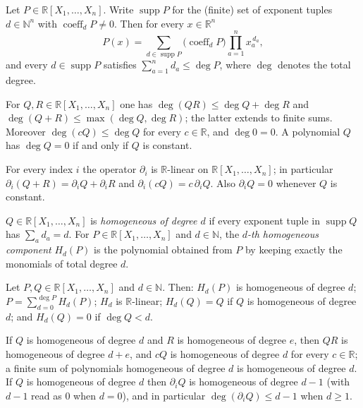\begin{proposition}
Let $P\in\mathbb{R}[X_1,\dots,X_n]$. Write $\operatorname{supp}P$ for the
(finite) set of exponent tuples $d\in\mathbb{N}^n$ with $\operatorname{coeff}_d P\ne0$.
Then for every $x\in\mathbb{R}^n$
\[
  P(x)=\sum_{d\in\operatorname{supp}P}\bigl(\operatorname{coeff}_dP\bigr)
        \prod_{a=1}^{n}x_a^{\,d_a},
\]
and every $d\in\operatorname{supp}P$ satisfies $\sum_{a=1}^{n}d_a\le\deg P$,
where $\deg$ denotes the total degree.
\end{proposition}

\begin{proposition}
For $Q,R\in\mathbb{R}[X_1,\dots,X_n]$ one has
$\deg(QR)\le\deg Q+\deg R$ and $\deg(Q+R)\le\max(\deg Q,\deg R)$; the latter
extends to finite sums. Moreover $\deg(cQ)\le\deg Q$ for every
$c\in\mathbb{R}$, and $\deg 0=0$. A polynomial $Q$ has $\deg Q=0$ if and only if
$Q$ is constant.
\end{proposition}

\begin{proposition}
For every index $i$ the operator $\partial_i$ is $\mathbb{R}$-linear on
$\mathbb{R}[X_1,\dots,X_n]$; in particular $\partial_i(Q+R)=\partial_iQ+\partial_iR$
and $\partial_i(cQ)=c\,\partial_iQ$. Also $\partial_iQ=0$ whenever $Q$ is constant.
\end{proposition}

\begin{definition}
$Q\in\mathbb{R}[X_1,\dots,X_n]$ is \emph{homogeneous of degree $d$} if every
exponent tuple in $\operatorname{supp}Q$ has $\sum_a d_a=d$. For
$P\in\mathbb{R}[X_1,\dots,X_n]$ and $d\in\mathbb{N}$, the \emph{$d$-th
homogeneous component} $H_d(P)$ is the polynomial obtained from $P$ by keeping
exactly the monomials of total degree $d$.
\end{definition}

\begin{proposition}
Let $P,Q\in\mathbb{R}[X_1,\dots,X_n]$ and $d\in\mathbb{N}$. Then:
$H_d(P)$ is homogeneous of degree $d$; $P=\sum_{d=0}^{\deg P}H_d(P)$;
$H_d$ is $\mathbb{R}$-linear; $H_d(Q)=Q$ if $Q$ is homogeneous of degree $d$;
and $H_d(Q)=0$ if $\deg Q<d$.
\end{proposition}

\begin{proposition}
If $Q$ is homogeneous of degree $d$ and $R$ is homogeneous of degree $e$, then
$QR$ is homogeneous of degree $d+e$, and $cQ$ is homogeneous of degree $d$ for
every $c\in\mathbb{R}$; a finite sum of polynomials homogeneous of degree $d$ is
homogeneous of degree $d$. If $Q$ is homogeneous of degree $d$ then
$\partial_iQ$ is homogeneous of degree $d-1$ (with $d-1$ read as $0$ when
$d=0$), and in particular $\deg(\partial_iQ)\le d-1$ when $d\ge1$.
\end{proposition}

